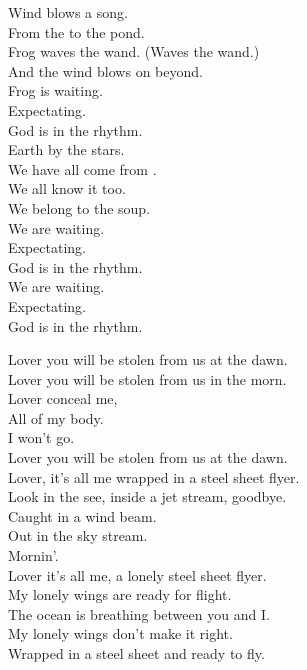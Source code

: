 Wind blows a song. \\
From the  to the pond. \\
Frog waves the wand. (Waves the wand.) \\
And the wind blows on beyond. \\

Frog is waiting. \\
Expectating. \\
God is in the rhythm. \\

Earth by the stars. \\
We have all come from . \\
We all know it too. \\
We belong to the soup. \\

We are waiting. \\
Expectating. \\
God is in the rhythm. \\

We are waiting. \\
Expectating. \\
God is in the rhythm. \\




Lover you will be stolen from us at the dawn. \\
Lover you will be stolen from us in the morn. \\
Lover conceal me, \\
All of my body. \\
I won't go. \\
Lover you will be stolen from us at the dawn. \\

Lover, it's all me wrapped in a steel sheet flyer. \\
Look in the  see, inside a jet stream, goodbye. \\
Caught in a wind beam. \\
Out in the sky stream. \\
Mornin'. \\
Lover it's all me, a lonely steel sheet flyer. \\

My lonely wings are ready for flight. \\
The ocean is breathing between you and I. \\
My lonely wings don't make it right. \\
Wrapped in a steel sheet and ready to fly. \\

